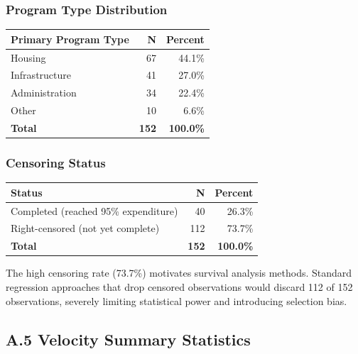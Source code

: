 \documentclass[
  12pt,
  letterpaper,
]{article}
\begin{document}
\subsubsection{Program Type
Distribution}\label{program-type-distribution}

\begin{longtable}[]{@{}lrr@{}}
\toprule\noalign{}
\textbf{Primary Program Type} & \textbf{N} & \textbf{Percent} \\
\midrule\noalign{}
\endhead
\bottomrule\noalign{}
\endlastfoot
Housing & 67 & 44.1\% \\
Infrastructure & 41 & 27.0\% \\
Administration & 34 & 22.4\% \\
Other & 10 & 6.6\% \\
\textbf{Total} & \textbf{152} & \textbf{100.0\%} \\
\end{longtable}

\subsubsection{Censoring Status}\label{censoring-status}

\begin{longtable}[]{@{}lrr@{}}
\toprule\noalign{}
\textbf{Status} & \textbf{N} & \textbf{Percent} \\
\midrule\noalign{}
\endhead
\bottomrule\noalign{}
\endlastfoot
Completed (reached 95\% expenditure) & 40 & 26.3\% \\
Right-censored (not yet complete) & 112 & 73.7\% \\
\textbf{Total} & \textbf{152} & \textbf{100.0\%} \\
\end{longtable}

The high censoring rate (73.7\%) motivates survival analysis methods.
Standard regression approaches that drop censored observations would
discard 112 of 152 observations, severely limiting statistical power and
introducing selection bias.

\subsection{A.5 Velocity Summary
Statistics}\label{a.5-velocity-summary-statistics}
\end{document}
